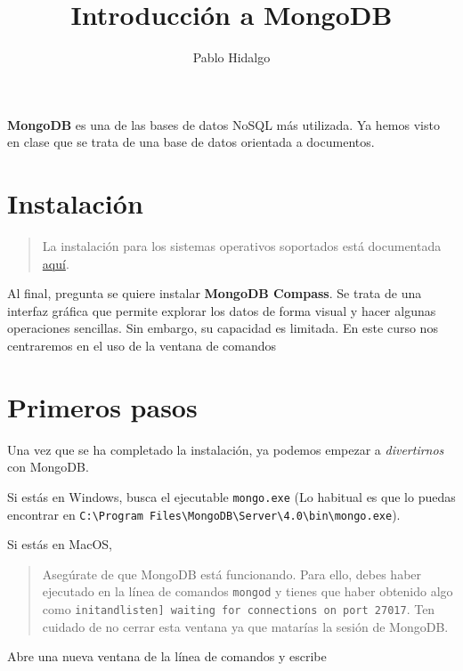 \documentclass[]{article}
\title{Introducción a MongoDB}
\author{Pablo Hidalgo}
\date{}
\begin{document}
\maketitle

{
\setcounter{tocdepth}{2}
\tableofcontents
}
\textbf{MongoDB} es una de las bases de datos NoSQL más utilizada. Ya
hemos visto en clase que se trata de una base de datos orientada a
documentos.

\hypertarget{instalacion}{%
\section{Instalación}\label{instalacion}}

\begin{quote}
La instalación para los sistemas operativos soportados está documentada
\href{https://docs.mongodb.com/manual/installation/}{aquí}.
\end{quote}

Al final, pregunta se quiere instalar \textbf{MongoDB Compass}. Se trata
de una interfaz gráfica que permite explorar los datos de forma visual y
hacer algunas operaciones sencillas. Sin embargo, su capacidad es
limitada. En este curso nos centraremos en el uso de la ventana de
comandos

\hypertarget{primeros-pasos}{%
\section{Primeros pasos}\label{primeros-pasos}}

Una vez que se ha completado la instalación, ya podemos empezar a
\emph{divertirnos} con MongoDB.

Si estás en Windows, busca el ejecutable \texttt{mongo.exe} (Lo habitual
es que lo puedas encontrar en
\texttt{C:\textbackslash{}Program\ Files\textbackslash{}MongoDB\textbackslash{}Server\textbackslash{}4.0\textbackslash{}bin\textbackslash{}mongo.exe}).

Si estás en MacOS,

\begin{quote}
Asegúrate de que MongoDB está funcionando. Para ello, debes haber
ejecutado en la línea de comandos \texttt{mongod} y tienes que haber
obtenido algo como
\texttt{initandlisten{]}\ waiting\ for\ connections\ on\ port\ 27017}.
Ten cuidado de no cerrar esta ventana ya que matarías la sesión de
MongoDB.
\end{quote}

Abre una nueva ventana de la línea de comandos y escribe
\end{document}
